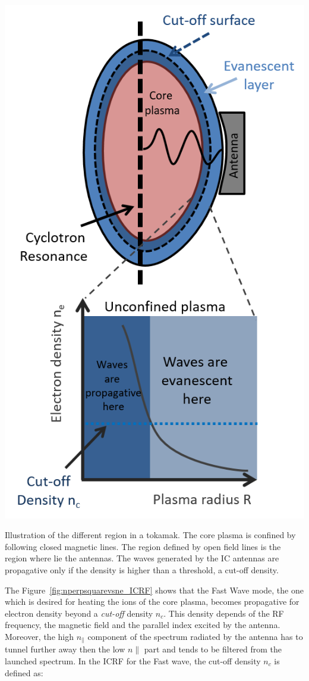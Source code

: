\begin{marginfigure}
	\centering
	\includegraphics[width=1.0\linewidth]{figures/chap2/core_edge_antenna}
	\caption{Illustration of the different region in a tokamak. The core plasma is confined by following closed magnetic lines. The region defined by open field lines is the region where lie the antennas. The waves generated by the IC antennas are propagative only if the density is higher than a threshold, a cut-off density.}
	\label{fig:coreedgeantenna}
\end{marginfigure}
The Figure~\ref{fig:nperpsquarevsne_ICRF} shows that the Fast Wave mode, the one which is desired for heating the ions of the core plasma, becomes propagative for electron density beyond a \textit{cut-off} density $n_{c}$. This density depends of the RF frequency, the magnetic field and the parallel index excited by the antenna. Moreover, the high $n_\parallel$ component of the spectrum radiated by the antenna has to tunnel further away then the low $n\parallel$ part and tends to be filtered from the launched spectrum. In the ICRF for the Fast wave, the cut-off density $n_c$ is defined as: 
